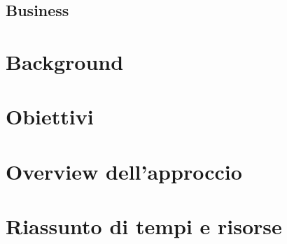\documentclass{article}
\begin{document}
  


  \subsection{Business}

  \newpage
  \section{Background} %

  \newpage
  \section{Obiettivi}

  \newpage
  \section{Overview dell'approccio}

  \newpage
  \section{Riassunto di tempi e risorse}
\end{document}
